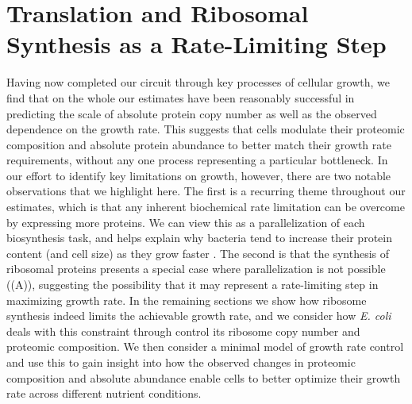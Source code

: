 \section{Translation and Ribosomal Synthesis as a Rate-Limiting Step}
Having now completed our circuit through key processes of cellular growth,
we find that on the whole our estimates have been reasonably successful in predicting
the scale of absolute protein copy number as well as the observed dependence on
the growth rate. This suggests that cells modulate their proteomic
composition and absolute protein abundance to better match their growth rate
requirements, without any one process representing a particular bottleneck. In
our effort to identify key limitations on growth, however, there are two notable
observations that we highlight here. The first is a recurring theme throughout
our estimates, which is that any inherent biochemical rate limitation can be
overcome by expressing more proteins. We can view this as a parallelization of
each biosynthesis task, and helps explain why bacteria
tend to increase their protein content (and cell size) as they grow faster
\citep{ojkic2019}. The second is that the synthesis of ribosomal proteins presents a
special case where parallelization is not possible ((A)),
suggesting the possibility that it may represent a rate-limiting step in
maximizing growth rate. In the remaining sections we show how ribosome synthesis
indeed limits the achievable growth rate, and we consider how \textit{E. coli}
deals with this constraint through control its ribosome copy number and
proteomic composition.  We then consider a minimal model of growth rate control and use this
to gain insight into how the observed changes in proteomic composition and absolute
abundance enable cells to better optimize their growth rate across different
nutrient conditions.


